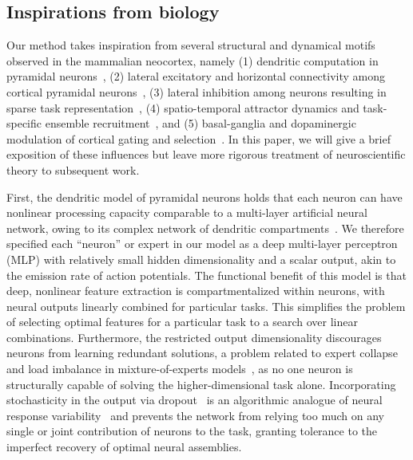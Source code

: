 \documentclass{article}
\begin{document}
\subsection{Inspirations from biology}
Our method takes inspiration from several structural and dynamical motifs observed in the mammalian neocortex, namely (1) dendritic computation in pyramidal neurons~\citep{poirazi2003pyramidal,poirazi2020illuminating,beniaguev2021single}, (2) lateral excitatory and horizontal connectivity among cortical pyramidal neurons~\citep{hubel1962receptive,gilbert1983clustered,douglas2004neuronal}, (3) lateral inhibition among neurons resulting in sparse task representation~\citep{douglas2004neuronal,maass2000computational,amari1977dynamics}, (4) spatio-temporal attractor dynamics and task-specific ensemble recruitment~\citep{yang2019task,cichon2015branch,mongillo2018inhibitory,rolls2010attractor,khona2022attractor}, and (5) basal-ganglia and dopaminergic modulation of cortical gating and selection~\citep{mink1996basal,schultz1997neural,frank2001interactions,oreilly2006making}. In this paper, we will give a brief exposition of these influences but leave more rigorous treatment of neuroscientific theory to subsequent work.

First, the dendritic model of pyramidal neurons holds that each neuron can have nonlinear processing capacity comparable to a multi-layer artificial neural network, owing to its complex network of dendritic compartments~\citep{poirazi2003pyramidal,poirazi2020illuminating,beniaguev2021single}. We therefore specified each ``neuron'' or expert in our model as a deep multi-layer perceptron (MLP) with relatively small hidden dimensionality and a scalar output, akin to the emission rate of action potentials. The functional benefit of this model is that deep, nonlinear feature extraction is compartmentalized within neurons, with neural outputs linearly combined for particular tasks. This simplifies the problem of selecting optimal features for a particular task to a search over linear combinations. Furthermore, the restricted output dimensionality discourages neurons from learning redundant solutions, a problem related to expert collapse and load imbalance in mixture-of-experts models~\citep{shazeer2017outrageously,fedus2022switch}, as no one neuron is structurally capable of solving the higher-dimensional task alone. Incorporating stochasticity in the output via dropout~\citep{srivastava2014dropout} is an algorithmic analogue of neural response variability~\citep{faisal2008noise,mainen1995reliability} and prevents the network from relying too much on any single or joint contribution of neurons to the task, granting tolerance to the imperfect recovery of optimal neural assemblies.
\end{document}
